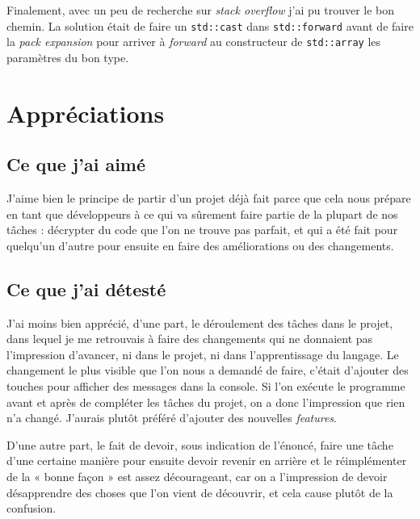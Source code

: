 \documentclass{article}
\begin{document}
Finalement, avec un peu de recherche sur \textit{stack overflow} j'ai pu trouver le bon chemin. La solution était de faire un \texttt{std::cast} dans \texttt{std::forward} avant de faire la \textit{pack expansion} pour arriver à \textit{forward} au constructeur de \texttt{std::array} les paramètres du bon type.

\section{Appréciations}

\subsection*{Ce que j'ai aimé}

J'aime bien le principe de partir d'un projet déjà fait parce que cela nous prépare en tant que développeurs à ce qui va sûrement faire partie de la plupart de nos tâches : décrypter du code que l'on ne trouve pas parfait, et qui a été fait pour quelqu'un d'autre pour ensuite en faire des améliorations ou des changements.

\subsection*{Ce que j'ai détesté}

J'ai moins bien apprécié, d'une part, le déroulement des tâches dans le projet, dans lequel je me retrouvais à faire des changements qui ne donnaient pas l'impression d'avancer, ni dans le projet, ni dans l'apprentissage du langage. Le changement le plus visible que l'on nous a demandé de faire, c'était d'ajouter des touches pour afficher des messages dans la console. Si l'on exécute le programme avant et après de compléter les tâches du projet, on a donc l'impression que rien n'a changé. J'aurais plutôt préféré d'ajouter des nouvelles \textit{features}. 

D'une autre part, le fait de devoir, sous indication de l'énoncé, faire une tâche d'une certaine manière pour ensuite devoir revenir en arrière et le réimplémenter de la « bonne façon » est assez décourageant, car on a l'impression de devoir désapprendre des choses que l'on vient de découvrir, et cela cause plutôt de la confusion.
\end{document}
